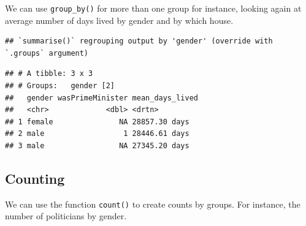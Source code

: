 \documentclass[
]{book}
\newenvironment{Shaded}{\begin{snugshade}}{\end{snugshade}}
\newcommand{\DataTypeTok}[1]{\textcolor[rgb]{0.13,0.29,0.53}{#1}}
\newcommand{\DecValTok}[1]{\textcolor[rgb]{0.00,0.00,0.81}{#1}}
\newcommand{\KeywordTok}[1]{\textcolor[rgb]{0.13,0.29,0.53}{\textbf{#1}}}
\newcommand{\NormalTok}[1]{#1}
\newcommand{\OperatorTok}[1]{\textcolor[rgb]{0.81,0.36,0.00}{\textbf{#1}}}
\newcommand{\StringTok}[1]{\textcolor[rgb]{0.31,0.60,0.02}{#1}}
\begin{document}
We can use \texttt{group\_by()} for more than one group for instance, looking again at average number of days lived by gender and by which house.

\begin{Shaded}
\end{Shaded}

\begin{verbatim}
## `summarise()` regrouping output by 'gender' (override with `.groups` argument)
\end{verbatim}

\begin{verbatim}
## # A tibble: 3 x 3
## # Groups:   gender [2]
##   gender wasPrimeMinister mean_days_lived
##   <chr>             <dbl> <drtn>         
## 1 female               NA 28857.30 days  
## 2 male                  1 28446.61 days  
## 3 male                 NA 27345.20 days
\end{verbatim}

\hypertarget{counting}{%
\subsection{Counting}\label{counting}}

We can use the function \texttt{count()} to create counts by groups. For instance, the number of politicians by gender.

\begin{Shaded}
\end{Shaded}
\end{document}

